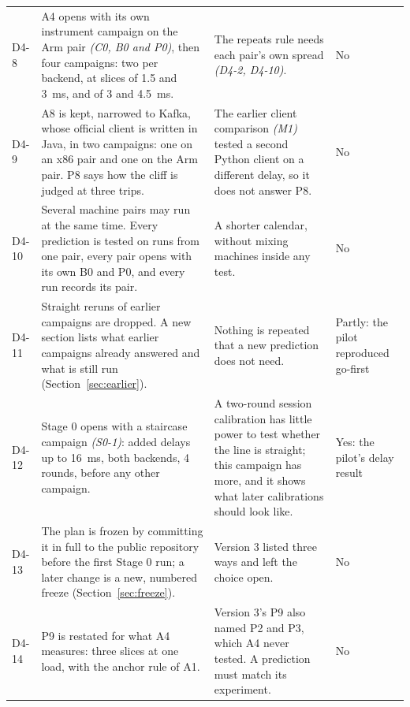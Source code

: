 \documentclass[11pt]{article}
\newcommand{\gl}[1]{{\color{soft}\itshape\small (#1)}}
\begin{document}
{\begin{longtable}{@{}p{1.0cm} >{\raggedright\arraybackslash}p{6.6cm} >{\raggedright\arraybackslash}p{5.9cm} >{\raggedright\arraybackslash}p{1.9cm}@{}}
D4-8 & A4 opens with its own instrument campaign on the Arm pair \gl{C0, B0 and P0}, then four campaigns: two per backend, at slices of 1.5 and 3~ms, and of 3 and 4.5~ms. & The repeats rule needs each pair's own spread \gl{D4-2, D4-10}. & No \\
D4-9 & A8 is kept, narrowed to Kafka, whose official client is written in Java, in two campaigns: one on an x86 pair and one on the Arm pair. P8 says how the cliff is judged at three trips. & The earlier client comparison \gl{M1} tested a second Python client on a different delay, so it does not answer P8. & No \\
D4-10 & Several machine pairs may run at the same time. Every prediction is tested on runs from one pair, every pair opens with its own B0 and P0, and every run records its pair. & A shorter calendar, without mixing machines inside any test. & No \\
D4-11 & Straight reruns of earlier campaigns are dropped. A new section lists what earlier campaigns already answered and what is still run (Section~\ref{sec:earlier}). & Nothing is repeated that a new prediction does not need. & Partly: the pilot reproduced go-first \\
D4-12 & Stage 0 opens with a staircase campaign \gl{S0-1}: added delays up to 16~ms, both backends, 4 rounds, before any other campaign. & A two-round session calibration has little power to test whether the line is straight; this campaign has more, and it shows what later calibrations should look like. & Yes: the pilot's delay result \\
D4-13 & The plan is frozen by committing it in full to the public repository before the first Stage 0 run; a later change is a new, numbered freeze (Section~\ref{sec:freeze}). & Version 3 listed three ways and left the choice open. & No \\
D4-14 & P9 is restated for what A4 measures: three slices at one load, with the anchor rule of A1. & Version 3's P9 also named P2 and P3, which A4 never tested. A prediction must match its experiment. & No \\
\bottomrule
\end{longtable}}
\end{document}
